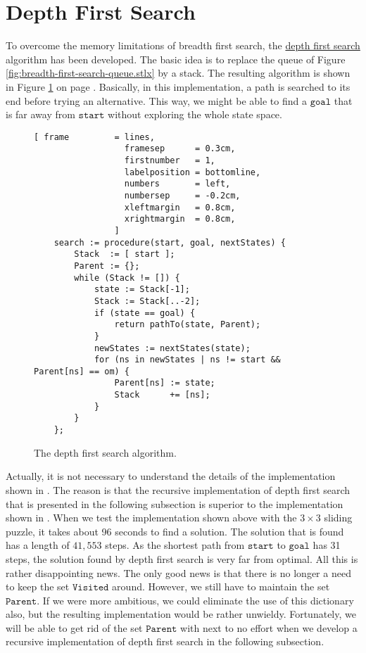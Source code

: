 \section{Depth First Search}
To overcome the memory limitations of breadth first search, the
\href{https://en.wikipedia.org/wiki/Depth-first_search}{depth first search} algorithm has been
developed.  The basic idea is to replace the queue of Figure
\ref{fig:breadth-first-search-queue.stlx} by a stack.  The resulting algorithm is shown in Figure
\ref{fig:depth-first-search.stlx} on page \pageref{fig:depth-first-search.stlx}.  Basically, in this
implementation, a path is searched to its end before trying an alternative.  This way, we might be able to find a
$\mathtt{goal}$ that is far away from $\mathtt{start}$ without exploring the whole state space.  

\begin{figure}[!ht]
\centering
\begin{Verbatim}[ frame         = lines, 
                  framesep      = 0.3cm, 
                  firstnumber   = 1,
                  labelposition = bottomline,
                  numbers       = left,
                  numbersep     = -0.2cm,
                  xleftmargin   = 0.8cm,
                  xrightmargin  = 0.8cm,
                ]
    search := procedure(start, goal, nextStates) {
        Stack  := [ start ];
        Parent := {};
        while (Stack != []) {
            state := Stack[-1];
            Stack := Stack[..-2];
            if (state == goal) {
                return pathTo(state, Parent);
            }
            newStates := nextStates(state);
            for (ns in newStates | ns != start && Parent[ns] == om) { 
                Parent[ns] := state;
                Stack      += [ns];
            }
        }
    };
\end{Verbatim}
\vspace*{-0.3cm}
\caption{The depth first search algorithm.}
\label{fig:depth-first-search.stlx}
\end{figure}
Actually, it is not necessary to understand the details of the implementation shown in
.  The reason is that the recursive implementation of depth first
search that is presented in the following subsection is superior to the implementation shown in
.
When we test the implementation shown above with the $3 \times 3$ sliding puzzle, it takes about 96 seconds to find a solution.  
The solution that is found has a length of $41,553$ steps.  As the
shortest path from $\mathtt{start}$ to $\mathtt{goal}$ has 31 steps, the solution found by depth
first search is very far from optimal.  All this is rather disappointing news.  The only good news
is that there is no longer a need to keep the set $\mathtt{Visited}$ around.  However, we still have
to maintain the set $\mathtt{Parent}$.  If we were more ambitious, we could eliminate the use of
this dictionary also, but the resulting implementation would be rather unwieldy.  Fortunately, we will be
able to get rid of the set $\mathtt{Parent}$ with next to no effort when we develop a recursive
implementation of depth first search in the following subsection.

